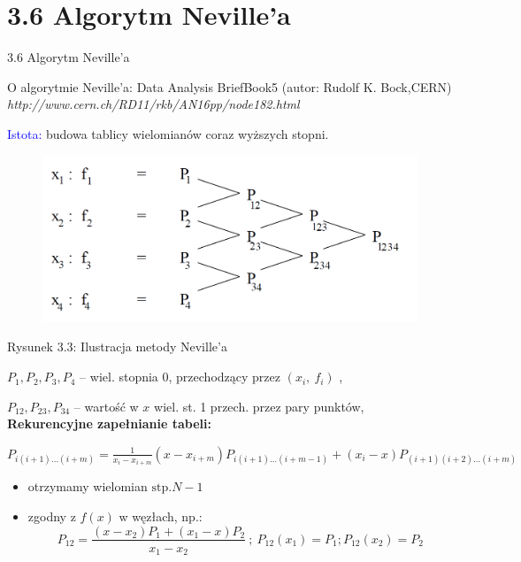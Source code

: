 \section{3.6 Algorytm Neville'a}
\begin{frame}
{3.6 Algorytm Neville'a}

O algorytmie Neville'a: Data Analysis BriefBook5 (autor: Rudolf K. Bock,CERN)
{\it http://www.cern.ch/RD11/rkb/AN16pp/node182.html} \newline

\textcolor{blue}{Istota:} budowa tablicy wielomianów coraz wyższych stopni.
\begin{figure}[h]
			\includegraphics[scale = 0.28]{img/3/interpol_3_6}
	\end{figure}
Rysunek 3.3: Ilustracja metody Neville'a
\end{frame}

\begin{frame}
$P_{1}, P_{2}, P_{3}, P_{4}$ -- wiel. stopnia $0$, przechodzący przez $(x_{i},\ f_{i})$ ,

$P_{12}, P_{23}, P_{34}$ -- wartość w $x$ wiel. st. 1 przech. przez pary punktów, \\
\vspace{4mm}
\textbf{Rekurencyjne zapełnianie tabeli:}

$P_{i(i+1)\ldots(i+m)}=\displaystyle \frac{1}{x_{i}-x_{i+m}}(x-x_{i+m})P_{i(i+1)\ldots(i+m-1)}+(x_{i}-x)P_{(i+1)(i+2)\ldots(i+m)}$

\begin{itemize}
\item otrzymamy wielomian $\mathrm{s}\mathrm{t}\mathrm{p}. N-1$

\item zgodny z $f(x)$ w węzłach, np.:
$$
P_{12}=\frac{(x-x_{2})P_{1}+(x_{1}-x)P_{2}}{x_{1}-x_{2}}\ ;\ P_{12}(x_{1})=P_{1};P_{12}(x_{2})=P_{2}
$$

\end{itemize}

\end{frame}

